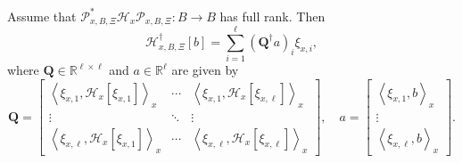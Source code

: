 \documentclass[final,onefignum,onetabnum]{siamart250211}
\begin{document}
\begin{proposition}
  \label{prop:manifold-computational}
  Assume that $\mathcal{P}_{x, B, \Xi}^* \mathcal{H}_x \mathcal{P}_{x, B, \Xi}: B \to B$ has full rank.
  Then
\[  
\mathcal{H}_{x, B, \Xi}^{\dagger}[b]=\sum_{i =1}^{\ell}\left({\mathbf{Q}}^{\dagger} a\right)_{i} \xi_{x, i},
\]
where $\mathbf{Q} \in \mathbb{R}^{\ell \times \ell}$ and ${a} \in \mathbb{R}^{\ell}$ are given by
\begin{equation}
  \label{eq: Q and a}
\mathbf{Q}=\left[\begin{array}{ccc}
\left\langle \xi_{x, 1}, \mathcal{H}_x\left[\xi_{x, 1}\right]\right\rangle_{x} & \cdots & \left\langle \xi_{x, 1}, \mathcal{H}_x\left[\xi_{x, \ell}\right]\right\rangle_{x} \\
\vdots & \ddots & \vdots \\
\left\langle \xi_{x, \ell}, \mathcal{H}_x\left[\xi_{x, 1}\right]\right\rangle_{x} & \cdots & \left\langle \xi_{x, \ell}, \mathcal{H}_x\left[\xi_{x, \ell}\right]\right\rangle_{x}
\end{array}\right], \quad 
{a}=\left[\begin{array}{c}
\left\langle \xi_{x, 1}, b\right\rangle_{x} \\
\vdots \\
\left\langle \xi_{x, \ell}, b\right\rangle_{x}
\end{array}\right].
\end{equation}
\end{proposition}
\end{document}
